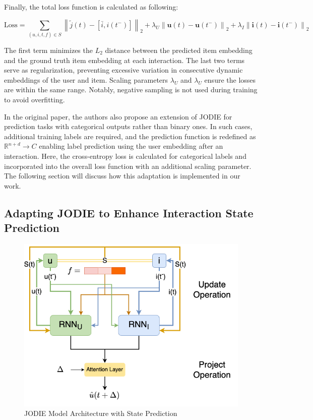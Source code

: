 Finally, the total loss function is calculated as following:

\begin{equation}
    \text{Loss} = \sum_{(u, i, t, f) \in S} \left\| \tilde{j}(t) - \left[ \bar{i}, i(t^-) \right] \right\|_2 
    + \lambda_U \left\| \mathbf{u}(t) - \mathbf{u}(t^-) \right\|_2 
    + \lambda_I \left\| \mathbf{i}(t) - \mathbf{i}(t^-) \right\|_2
    \end{equation}


The first term minimizes the  $L_2$ distance between the predicted item embedding and the ground truth item embedding at each interaction. The last two terms serve as regularization, preventing excessive variation in consecutive dynamic embeddings of the user and item. Scaling parameters  $\lambda_U$ and $\lambda_U$ ensure the losses are within the same range. Notably, negative sampling is not used during training to avoid overfitting.


In the original paper, the authors also propose an extension of JODIE for prediction tasks with categorical outputs rather than binary ones. In such cases, additional training labels are required, and the prediction function is redefined as $\mathbb{R} ^{n+d}\rightarrow C$ enabling label prediction using the user embedding after an interaction. Here, the cross-entropy loss is calculated for categorical labels and incorporated into the overall loss function with an additional scaling parameter. The following section will discuss how this adaptation is implemented in our work.




\subsection{Adapting JODIE to Enhance Interaction State Prediction}
\begin{figure}[h]
    \centering
    \includegraphics[width=\linewidth]{figures/04_JODIE_with_state.png}
    \caption{JODIE Model Architecture with State Prediction}
    \label{fig:JODIE_with_state}
\end{figure}


